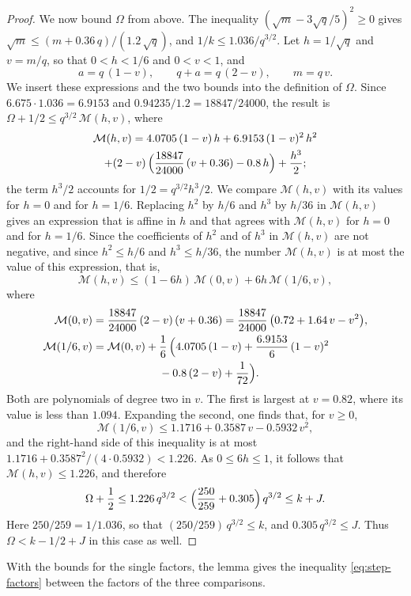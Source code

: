 \documentclass{amsart}
\theoremstyle{definition}
\theoremstyle{remark}
\numberwithin{equation}{section}
\begin{document}
\begin{proof}
We now bound $\Omega$ from above. The inequality
$(\sqrt m-3\sqrt q/5)^2\ge0$ gives
$\sqrt m\le(m+0.36\,q)/(1.2\,\sqrt q)$, and $1/k\le1.036/q^{3/2}$. Let
$h=1/\sqrt q$ and $v=m/q$, so that $0<h<1/6$ and $0<v<1$, and
\[
a=q\,(1-v),\qquad q+a=q\,(2-v),\qquad m=q\,v .
\]
We insert these expressions and the two bounds into the definition of
$\Omega$. Since $6.675\cdot1.036=6.9153$ and $0.94235/1.2=18847/24000$, the
result is $\Omega+1/2\le q^{3/2}\,\mathcal M(h,v)$, where
\begin{multline*}
\mathcal M(h,v)=4.0705\,(1-v)\,h+6.9153\,(1-v)^2\,h^2\\
+(2-v)\,\Bigl(\frac{18847}{24000}\,(v+0.36)-0.8\,h\Bigr)+\frac{h^3}{2};
\end{multline*}
the term $h^3/2$ accounts for $1/2=q^{3/2}h^3/2$. We compare
$\mathcal M(h,v)$ with its values for $h=0$ and for $h=1/6$. Replacing
$h^2$ by $h/6$ and $h^3$ by $h/36$ in $\mathcal M(h,v)$ gives an expression
that is affine in $h$ and that agrees with $\mathcal M(h,v)$ for $h=0$ and
for $h=1/6$. Since the coefficients of $h^2$ and of $h^3$ in
$\mathcal M(h,v)$ are not negative, and since $h^2\le h/6$ and
$h^3\le h/36$, the number $\mathcal M(h,v)$ is at most the value of this
expression, that is,
\[
\mathcal M(h,v)\le(1-6h)\,\mathcal M(0,v)+6h\,\mathcal M(1/6,v),
\]
where
\begin{align*}
\mathcal M(0,v)&=\frac{18847}{24000}\,(2-v)\,(v+0.36)
=\frac{18847}{24000}\,\bigl(0.72+1.64\,v-v^2\bigr),\\
\mathcal M(1/6,v)&=\mathcal M(0,v)+\frac16\,\Bigl(4.0705\,(1-v)
+\frac{6.9153}{6}\,(1-v)^2\\
&\qquad\qquad\qquad-0.8\,(2-v)+\frac{1}{72}\Bigr).
\end{align*}
Both are polynomials of degree two in $v$. The first is largest at
$v=0.82$, where its value is less than $1.094$. Expanding the second, one
finds that, for $v\ge0$,
\[
\mathcal M(1/6,v)\le1.1716+0.3587\,v-0.5932\,v^2 ,
\]
and the right-hand side of this inequality is at most
$1.1716+0.3587^2/(4\cdot0.5932)<1.226$. As $0\le6h\le1$, it follows that
$\mathcal M(h,v)\le1.226$, and therefore
\[
\Omega+\frac12\le1.226\,q^{3/2}
<\Bigl(\frac{250}{259}+0.305\Bigr)\,q^{3/2}\le k+J .
\]
Here $250/259=1/1.036$, so that $(250/259)\,q^{3/2}\le k$, and
$0.305\,q^{3/2}\le J$. Thus $\Omega<k-1/2+J$ in this case as well.
\end{proof}

With the bounds for the single factors, the lemma gives the inequality
\eqref{eq:step-factors} between the factors of the three comparisons.
\end{document}
